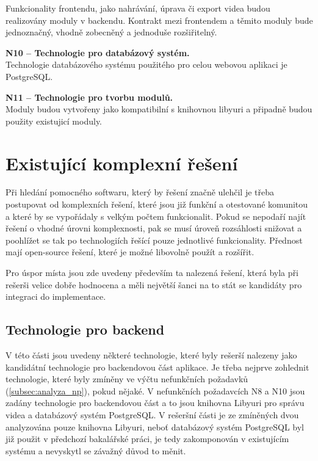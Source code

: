 \documentclass[thesis=M,czech]{FITthesis}[2012/06/26]
\begin{document}
\begin{description}
	Funkcionality frontendu, jako nahrávání, úprava či export videa budou realizovány moduly v backendu. Kontrakt mezi frontendem a těmito moduly bude jednoznačný, vhodně zobecněný a jednoduše rozšiřitelný.
    \item \textbf{N10 -- Technologie pro databázový systém.\\}
	Technologie databázového systému použitého pro celou webovou aplikaci je PostgreSQL.
    \item \textbf{N11 -- Technologie pro tvorbu modulů.\\}
	Moduly budou vytvořeny jako kompatibilní s knihovnou libyuri a připadně budou použity existujicí moduly.
  \end{description}

\section{Existující komplexní řešení} \label{sec:analyza_existujici_reseni}
Při hledání pomocného softwaru, který by řešení značně ulehčil je třeba postupovat od komplexních řešení, které jsou již funkční a otestované komunitou a které by se vypořádaly s velkým počtem funkcionalit. Pokud se nepodaří najít řešení o vhodné úrovni komplexnosti, pak se musí úroveň rozsáhlosti snižovat a poohlížet se tak po technologiích řešící pouze jednotlivé funkcionality. Přednost mají open-source řešení, které je možné libovolně použít a rozšířit.

	Pro úspor místa jsou zde uvedeny především ta nalezená řešení, která byla při rešerši velice dobře hodnocena a měli největší šanci na to stát se kandidáty pro integraci do implementace.


\subsection{Technologie pro backend} \label{subsec:analyza_reseni_backend}
V této části jsou uvedeny některé technologie, které byly rešerší nalezeny jako kandidátní technologie pro backendovou část aplikace. Je třeba nejprve zohlednit technologie, které byly zmíněny ve výčtu nefunkčních požadavků (\ref{subsec:analyza_np}), pokud nějaké. V nefunkčních požadavcích N8 a N10 jsou zadány technologie pro backendovou část a to jsou knihovna Libyuri pro správu videa a databázový systém PostgreSQL. V rešeršní části je ze zmíněných dvou analyzována pouze knihovna Libyuri, neboť databázový systém PostgreSQL byl již použit v předchozí bakalářské práci, je tedy zakomponován v existujícím systému a nevyskytl se závažný důvod to měnit.
\end{document}
